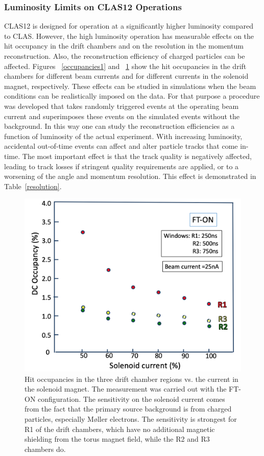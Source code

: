 \documentclass[final,3p,twocolumn]{elsarticle}
\begin{document}
\subsubsection{Luminosity Limits on CLAS12 Operations}

CLAS12 is designed for operation at a significantly higher luminosity compared to CLAS. However, the high luminosity
operation has measurable effects on the hit occupancy in the drift chambers and on the resolution in the momentum
reconstruction. Also, the reconstruction efficiency of charged particles can be affected. Figures ~\ref{occupancies1}
and ~\ref{occupancies2} show the hit occupancies in the drift chambers for different beam currents and for different
currents in the solenoid magnet, respectively. These effects can be studied in simulations when the beam conditions can
be realistically imposed on the data. For that purpose a procedure was developed that takes randomly triggered events
at the operating beam current and superimposes these events on the simulated events without the background. In this
way one can study the reconstruction efficiencies as a function of luminosity of the actual experiment. With increasing
luminosity, accidental out-of-time events can affect and alter particle tracks that come in-time. The most important
effect is that the track quality is negatively affected, leading to track losses if stringent quality requirements are
applied, or to a worsening of the angle and momentum resolution. This effect is demonstrated in Table~\ref{resolution}.   

\begin{figure}[t!]
\centerline{\includegraphics[width=1.0\columnwidth]{occupancy-solenoid.png}}
\caption{Hit occupancies in the three drift chamber regions vs. the current in the solenoid magnet. The
  measurement was carried out with the FT-ON configuration. The sensitivity on the solenoid current comes from
  the fact that the primary source background is from charged particles, especially M{\o}ller electrons. The
  sensitivity is strongest for R1 of the drift chambers, which have no additional magnetic shielding from the torus
  magnet field, while the R2 and R3 chambers do.}
\label{occupancies2}
\end{figure}
\end{document}
